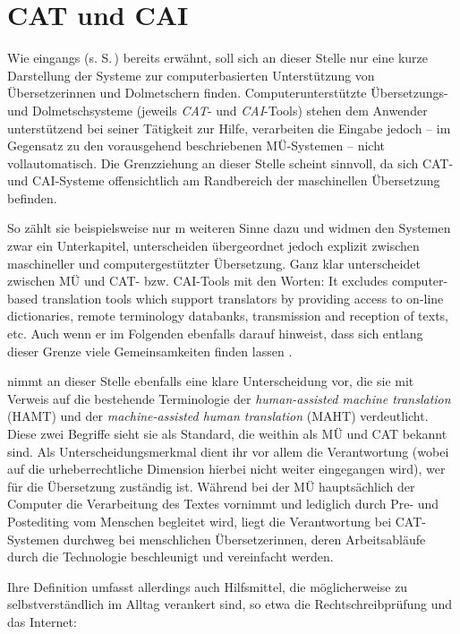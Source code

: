 
\section{CAT und CAI}\label{K3:sec:CATCAI}


Wie eingangs (s. S.\,\pageref{K3}) bereits erwähnt, soll sich an dieser Stelle nur eine kurze Darstellung der Systeme zur computerbasierten Unterstützung von Übersetzer{\textperiodcentered}innen und Dolmetschern finden. Computerunterstützte Übersetzungs- und Dolmetschsysteme (jeweils \emph{CAT}- und \emph{CAI}-Tools) stehen dem Anwender unterstützend bei seiner Tätigkeit zur Hilfe, verarbeiten die Eingabe jedoch -- im Gegensatz zu den vorausgehend beschriebenen MÜ-Systemen -- nicht vollautomatisch. Die Grenzziehung an dieser Stelle scheint sinnvoll, da sich CAT- und CAI-Systeme offensichtlich am Randbereich der maschinellen Übersetzung befinden. 

So zählt sie \citet[244]{zimmermann_maschinelle_2012} beispielsweise nur \glqq [i]m weiteren Sinne\grqq{} dazu und \citet[642, 654]{carstensen_computerlinguistik_2010} widmen den Systemen zwar ein Unterkapitel, unterscheiden übergeordnet jedoch explizit zwischen maschineller und computergestützter Übersetzung. Ganz klar unterscheidet \citet[431]{hutchins_machine_1995} zwischen MÜ und CAT- bzw. CAI-Tools mit den Worten: \glqq It excludes computer-based translation tools which support translators by providing access to on-line dictionaries, remote terminology databanks, transmission and reception of texts, etc.\grqq{} Auch wenn er im Folgenden ebenfalls darauf hinweist, dass sich entlang dieser Grenze viele Gemeinsamkeiten finden lassen \citep[431]{hutchins_machine_1995}.

\begin{sloppypar}
\citet[4]{bowker_computer-aided_2002} nimmt an dieser Stelle ebenfalls eine klare Unterscheidung vor, die sie mit Verweis auf die bestehende Terminologie der \emph{human-assisted machine translation} ({HAMT}) und der \emph{machine-assisted human translation} ({MAHT}) verdeutlicht. Diese zwei Begriffe sieht sie als Standard, die weithin als MÜ und CAT bekannt sind. Als Unterscheidungsmerkmal dient ihr vor allem die Verantwortung (wobei auf die urheberrechtliche Dimension hierbei nicht weiter eingegangen wird), wer für die Übersetzung zuständig ist. Während bei der MÜ hauptsächlich der Computer die Verarbeitung des Textes vornimmt und lediglich durch Pre- und Postediting vom Menschen begleitet wird, liegt die Verantwortung bei CAT-Systemen durchweg bei menschlichen Übersetzer{\textperiodcentered}innen, deren Arbeitsabläufe durch die Technologie beschleunigt und vereinfacht werden.

Ihre Definition umfasst allerdings auch Hilfsmittel, die möglicherweise zu selbstverständlich im Alltag verankert sind, so etwa die Rechtschreibprüfung und das Internet:
\end{sloppypar}

